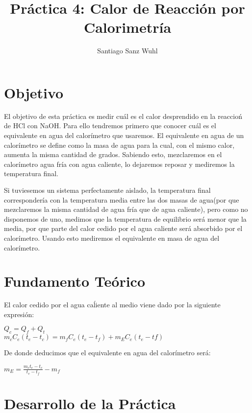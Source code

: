\documentclass[11pt,a4paper]{article}
\author{Santiago Sanz Wuhl}
\title{Práctica 4: Calor de Reacción por Calorimetría}
\begin{document}
\maketitle
\section{Objetivo}
\quad El objetivo de esta práctica es medir cuál es el calor desprendido en la reaccioń de HCl con NaOH. Para ello tendremos primero que conocer cuál es el equivalente en agua del calorímetro que usaremos. El equivalente en agua de un calorímetro se define como la masa de agua para la cual, con el mismo calor, aumenta la misma cantidad de grados. Sabiendo esto, mezclaremos en el calorímetro agua fría con agua caliente, lo dejaremos reposar y mediremos la temperatura final. 

Si tuviesemos un sistema perfectamente aislado, la temperatura final correspondería con la temperatura media entre las dos masas de agua(por que mezclaremos la misma cantidad de agua fría que de agua caliente), pero como no disponemos de uno, medimos que la temperatura de equilibrio será menor que la media, por que parte del calor cedido por el agua caliente será absorbido por el calorímetro. Usando esto mediremos el equivalente en masa de agua del calorímetro. 
\section{Fundamento Teórico}
\quad El calor cedido por el agua caĺiente al medio viene dado por la siguiente expresión:
\begin{center}
$Q_{c} = Q_{f} + Q_{t}$ \\
$m_{c}C_{e}(t_{e}-t_{c})=m_{f}C_{e}(t_{e}-t_{f})+m_{E}C_{e}(t_{e}-t{f})$ \\
\end{center}
De donde deducimos que el equivalente en agua del calorímetro será:
\begin{center}
$m_{E} = \frac{m_{c}t_{e}-t_{c}}{t_{e}-t_{f}} - m_{f}$
\end{center}
\section{Desarrollo de la Práctica}
\end{document}
